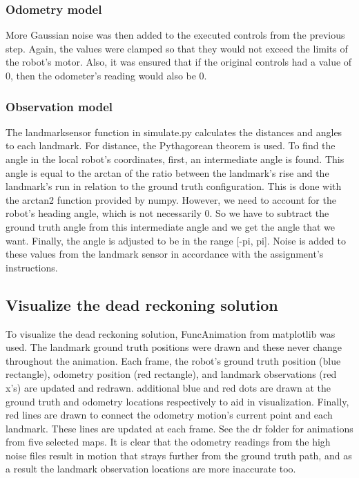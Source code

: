\documentclass{article}
\begin{document}
\subsubsection{Odometry model}
More Gaussian noise was then added to the executed controls from the previous step. Again, the values were clamped so that they would not exceed the limits of the robot's motor. Also, it was ensured that if the original controls had a value of 0, then the odometer's reading would also be 0.
\subsubsection{Observation model}
The landmark\textunderscore sensor function in simulate.py calculates the distances and angles to each landmark. For distance, the Pythagorean theorem is used. To find the angle in the local robot's coordinates, first, an intermediate angle is found. This angle is equal to the arctan of the ratio between the landmark's rise and the landmark's run in relation to the ground truth configuration. This is done with the arctan2 function provided by numpy. However, we need to account for the robot's heading angle, which is not necessarily 0. So we have to subtract the ground truth angle from this intermediate angle and we get the angle that we want. Finally, the angle is adjusted to be in the range [-pi, pi]. Noise is added to these values from the landmark sensor in accordance with the assignment's instructions.

\subsection{Visualize the dead reckoning solution}
To visualize the dead reckoning solution, FuncAnimation from matplotlib was used. The landmark ground truth positions were drawn and these never change throughout the animation. Each frame, the robot's ground truth position (blue rectangle), odometry position (red rectangle), and landmark observations (red x's) are updated and redrawn. additional blue and red dots are drawn at the ground truth and odometry locations respectively to aid in visualization. Finally, red lines are drawn to connect the odometry motion's current point and each landmark. These lines are updated at each frame. See the dr folder for animations from five selected maps. It is clear that the odometry readings from the high noise files result in motion that strays further from the ground truth path, and as a result the landmark observation locations are more inaccurate too.
\end{document}
